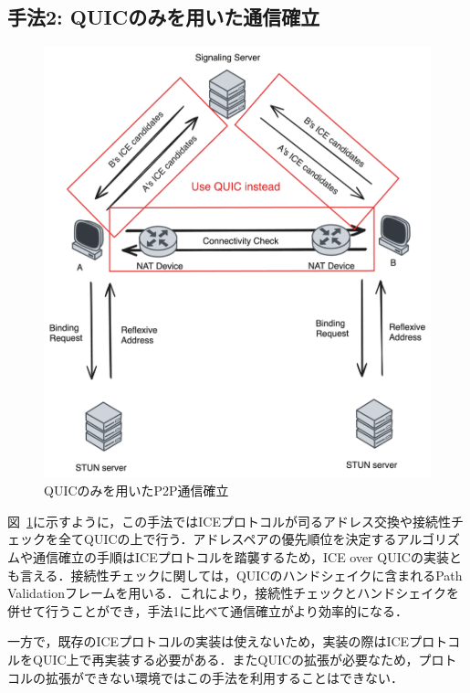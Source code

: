 \subsection{手法2: QUICのみを用いた通信確立}
\begin{figure}[h]
  \centering
  \includegraphics[width=\linewidth]{figs/approach-2.png}
  \caption{QUICのみを用いたP2P通信確立}
  \label{fig:two}
\end{figure}
図~\ref{fig:two}に示すように，この手法ではICEプロトコルが司るアドレス交換や接続性チェックを全てQUICの上で行う．アドレスペアの優先順位を決定するアルゴリズムや通信確立の手順はICEプロトコルを踏襲するため，ICE over QUICの実装とも言える．接続性チェックに関しては，QUICのハンドシェイクに含まれるPath Validationフレームを用いる．これにより，接続性チェックとハンドシェイクを併せて行うことができ，手法1に比べて通信確立がより効率的になる．

一方で，既存のICEプロトコルの実装は使えないため，実装の際はICEプロトコルをQUIC上で再実装する必要がある．またQUICの拡張が必要なため，プロトコルの拡張ができない環境ではこの手法を利用することはできない．
